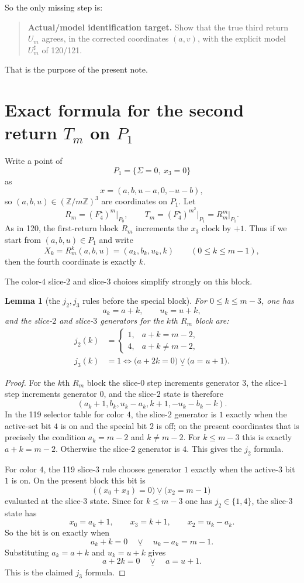 \documentclass[11pt]{article}
\newtheorem{lemma}[theorem]{Lemma}
\newcommand{\Z}{\mathbb Z}
\newcommand{\1}{\mathbf 1}
\newcommand{\xor}{\mathbin{\underline{\vee}}}
\begin{document}
So the only missing step is:

\begin{quote}
\textbf{Actual/model identification target.}
Show that the true third return $U_m$ agrees, in the corrected coordinates
$(a,v)$, with the explicit model $U_m^{\sharp}$ of 120/121.
\end{quote}

That is the purpose of the present note.

\section{Exact formula for the second return $T_m$ on $P_1$}

Write a point of
\[
P_1=\{\Sigma=0,\ x_3=0\}
\]
as
\[
x=(a,b,u-a,0,-u-b),
\]
so $(a,b,u)\in (\Z/m\Z)^3$ are coordinates on $P_1$. Let
\[
R_m=(F_4^{\star})^m\big|_{P_0},
\qquad
T_m=(F_4^{\star})^{m^2}\big|_{P_1}=R_m^m\big|_{P_1}.
\]
As in 120, the first-return block $R_m$ increments the $x_3$ clock by $+1$.
Thus if we start from $(a,b,u)\in P_1$ and write
\[
X_k=R_m^k(a,b,u)=(a_k,b_k,u_k,k)
\qquad (0\le k\le m-1),
\]
then the fourth coordinate is exactly $k$.

The color-$4$ slice-$2$ and slice-$3$ choices simplify strongly on this block.

\begin{lemma}[the $j_2,j_3$ rules before the special block]\label{lem:j2j3-before-special}
For $0\le k\le m-3$, one has
\[
a_k=a+k,
\qquad
u_k=u+k,
\]
and the slice-$2$ and slice-$3$ generators for the $k$th $R_m$ block are:
\begin{align*}
j_2(k)&=
\begin{cases}
1, & a+k=m-2,\\
4, & a+k\ne m-2,
\end{cases}
\\
j_3(k)&=1
\iff
\bigl(a+2k=0\bigr)\xor\bigl(a=u+1\bigr).
\end{align*}
\end{lemma}

\begin{proof}
For the $k$th $R_m$ block the slice-$0$ step increments generator $3$, the
slice-$1$ step increments generator $0$, and the slice-$2$ state is therefore
\[
(a_k+1,b_k,u_k-a_k, k+1,-u_k-b_k-k).
\]
In the 119 selector table for color $4$, the slice-$2$ generator is $1$ exactly
when the active-set bit $4$ is on and the special bit $2$ is off; on the
present coordinates that is precisely the condition $a_k=m-2$ and $k\ne m-2$.
For $k\le m-3$ this is exactly $a+k=m-2$. Otherwise the slice-$2$ generator is
$4$. This gives the $j_2$ formula.

For color $4$, the 119 slice-$3$ rule chooses generator $1$ exactly when the
active-$3$ bit $1$ is on. On the present block this bit is
\[
\bigl((x_0+x_3)=0\bigr)\xor\bigl(x_2=m-1\bigr)
\]
evaluated at the slice-$3$ state. Since for $k\le m-3$ one has $j_2\in\{1,4\}$,
the slice-$3$ state has
\[
x_0=a_k+1,
\qquad x_3=k+1,
\qquad x_2=u_k-a_k.
\]
So the bit is on exactly when
\[
a_k+k=0\quad\xor\quad u_k-a_k=m-1.
\]
Substituting $a_k=a+k$ and $u_k=u+k$ gives
\[
a+2k=0\quad\xor\quad a=u+1.
\]
This is the claimed $j_3$ formula.
\end{proof}
\end{document}
